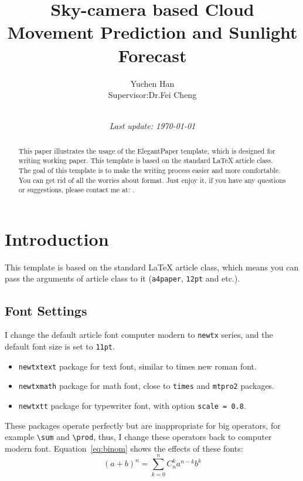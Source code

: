 \documentclass{elegantpaper}
\title{Sky-camera based Cloud Movement Prediction and Sunlight Forecast}
\author{Yuchen Han\\[1cm]{\small Supervisor:Dr.Fei Cheng}}
\date{\small\itshape \\ Last update: \today}
\begin{document}
\maketitle

\begin{abstract}
	This paper illustrates the usage of the ElegantPaper template, which is designed for writing working paper. This template is based on the standard \LaTeX{} article class. The goal of this template is to make the writing process easier and more comfortable. You can get rid of all the worries about format. Just enjoy it, if you have any questions or suggestions, please contact me at: .
\end{abstract}

\section{Introduction}

This template is based on the standard \LaTeX{} article class, which means you can pass the arguments of article class to it (\verb|a4paper|, \verb|12pt| and etc.).

\subsection{Font Settings}
I change the default article font computer modern to \verb|newtx| series, and the default font size is set to \verb|11pt|.

\begin{itemize}[noitemsep]
	\item \verb|newtxtext| package for text font, similar to times new roman font.
	\item \verb|newtxmath| package for math font, close to \verb|times| and \verb|mtpro2| packages.
	\item \verb|newtxtt| package for typewriter font, with option \verb|scale = 0.8|.
\end{itemize}

These packages operate perfectly but are inappropriate for big operators, for example \verb|\sum| and \verb|\prod|, thus, I change these operators back to computer modern font. Equation~\eqref{eq:binom} shows the effects of these fonts:
\begin{equation}
(a+b)^{n} = \sum_{k=0}^{n} C_{n}^{k} a^{n-k} b^k \label{eq:binom}
\end{equation}
\end{document}

